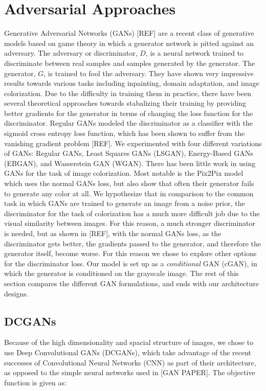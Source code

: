 \documentclass[10pt]{article}
\begin{document}
\section{Adversarial Approaches}
Generative Adversarial Networks (GANs) [REF] are a recent class of generative models based on game theory
in which a generator network is pitted against an adversary. The adversary or discriminator, $D$, is a 
neural network trained to discriminate between real samples and samples generated by the generator. The
generator, $G$, is trained to fool the adversary. They have shown very impressive results towards
various tasks including inpainting, domain adaptation, and image colorization. Due to the difficulty in
training them in practice, there have been several theoretical approaches towards stabalizing their training
by providing better gradients for the generator in terms of changing the loss function for the discriminator.
Regular GANs modeled the discriminator as a classifier with the sigmoid cross entropy loss function,
which has been shown to suffer from the vanishing gradient problem [REF]. We experimented with four different
variations of GANs: Regular GANs, Least Squares GANs (LSGAN), Energy-Based GANs (EBGAN), and Wasserstein GAN
(WGAN). There has been little work in using GANs for the task of image colorization. Most notable is the
Pix2Pix model which uses the normal GANs loss, but also show that often their generator fails to generate
any color at all. We hypothesize that in comparison to the common task in which GANs are trained to generate
an image from a noise prior, the discriminator for the task of colorization has a much more difficult job
due to the visual similarity between images. For this reason, a much stronger discriminator is needed, but
as shown in [REF], with the normal GANs loss, as the discriminator gets better, the gradients passed to the
generator, and therefore the generator itself, become worse. For this reason we chose to explore other
options for the discriminator loss. Our model is set up as a \textit{conditional} GAN (cGAN), in which the
generator is conditioned on the grayscale image. The rest of this section compares the different GAN
formulations, and ends with our architecture designs.

\subsection{DCGANs}
Because of the high dimensionality and spacial structure of images, we chose to use Deep Convolutional GANs
(DCGANs), which take advantage of the recent successes of Convolutional Neural Networks (CNN) as part of
their architecture, as opposed to the simple neural networks used in [GAN PAPER]. The objective function is
given as:
\end{document}

